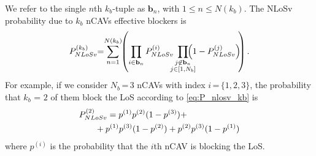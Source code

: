 \documentclass[journal]{IEEEtran}
\begin{document}
We refer to the single $n$th $k_b$-tuple as $\mathbf{b}_n$, with $1 \leq n \leq N{(k_b)}$. The NLoSv probability due to $k_b$ nCAVs effective blockers is
\begin{align} \label{eq:P_nlosv_kb}
P_{NLoSv}^{(k_b)}\hspace{-0.1cm}=\hspace{-0.1cm}\sum_{n = 1}^{ N{(k_b)}}\hspace{-0.1cm}\left( \prod_{i \in \mathbf{b}_n} P_{NLoSv}^{(i)} \hspace{-0.2cm}\prod_{\substack{j \not\in \mathbf{b}_n \\ j \in [1, N_b]}} \hspace{-0.4cm}\left(1- P_{NLoSv}^{(j)}\right) \hspace{-0.1cm}\right ).
\end{align}
For example, if we consider $N_b$\,=\,$3$ nCAVs with index $i$\,=\,$\{1,2,3\}$, the probability that $k_b$ = $2$ of them block the LoS according to \eqref{eq:P_nlosv_kb} is 
%
\begin{align} 
\begin{split}
    P_{NLoSv}^{(2)} &= p^{(1)} p^{(2)} (1-p^{(3)}) + \\ 
    &\hspace{-0.5cm}+ p^{(1)} p^{(3)} (1-p^{(2)}) + p^{(2)} p^{(3)} (1-p^{(1)}) 
\end{split}
\end{align}
%
where $p^{(i)}$ is the probability that the $i$th nCAV is blocking the LoS.\\
\end{document}
